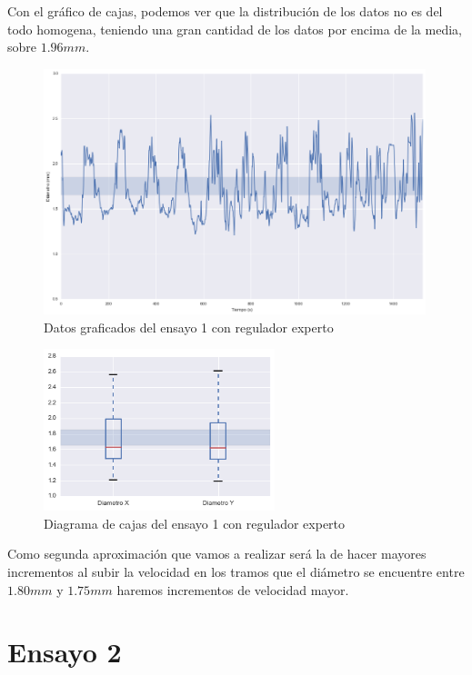 Con el gráfico de cajas, podemos ver que la distribución de los datos no es del todo homogena, teniendo una gran cantidad de los datos por encima de la media, sobre $1.96 mm$.

\begin{figure}[H]
    \centering
    \includegraphics[width=0.99\textwidth]{images/producciones/11082015/output_9_1.png}
    \caption{Datos graficados del ensayo 1 con regulador experto}
    \label{fig:reg_graf1}
\end{figure}

\begin{figure}[H]
    \centering
    \includegraphics[width=0.6\textwidth]{images/producciones/11082015/output_10_1.png}
    \caption{Diagrama de cajas del ensayo 1 con regulador experto}
    \label{fig:reg_cajas1}
\end{figure}

Como segunda aproximación que vamos a realizar será la de hacer mayores incrementos al subir la velocidad en los tramos que el diámetro se encuentre entre $1.80 mm$ y $1.75 mm$ haremos incrementos de velocidad mayor.

\section{Ensayo 2}


